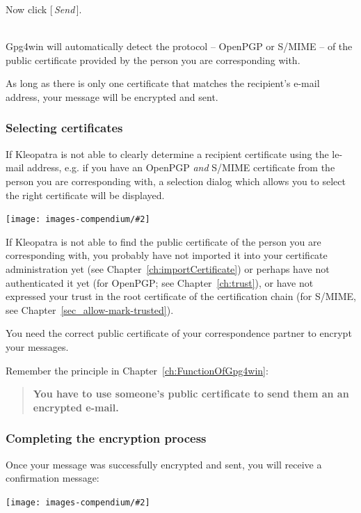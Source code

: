 \documentclass[a4paper,11pt,oneside,openright,titlepage]{scrbook}
\newcommand{\Button}[1]{[\,\textit{#1}\,]}
\newcommand{\Email}{e-mail}
\newcommand{\IncludeImage}[2][]{
\begin{center}
  \texttt{[image: images-compendium/\#2]}%
\end{center}
}
\begin{document}
Now click \Button{Send}.

\label{encryptProtocol} ~\\Gpg4win will automatically detect the
protocol -- OpenPGP or S/MIME -- of the public certificate provided by
the person you are corresponding with.

As long as there is only one certificate that matches the recipient's
\Email{} address, your message will be encrypted and sent.


\clearpage
\subsubsection{Selecting certificates}
If Kleopatra is not able to clearly determine a recipient certificate
using the l\Email{} address, e.g. if you have an OpenPGP
\textit{and} S/MIME certificate from the person you are corresponding
with, a selection dialog which allows you to select the right
certificate will be displayed.

\IncludeImage[width=0.85\textwidth]{sc-kleopatra-encrypt-selectCertificate_en}

If Kleopatra is not able to find the public certificate of the person
you are corresponding with, you probably have not imported it into
your certificate administration yet (see
Chapter~\ref{ch:importCertificate}) or perhaps have not authenticated
it yet (for OpenPGP; see Chapter~\ref{ch:trust}), or have not
expressed your trust in the root certificate of the certification
chain (for S/MIME, see Chapter~\ref{sec_allow-mark-trusted}).

You need the correct public certificate of your correspondence partner
to encrypt your messages.

Remember the principle in Chapter~\ref{ch:FunctionOfGpg4win}:
\begin{quote}
  \textbf{You have to use someone's public certificate to send them an an encrypted \Email{}.}
\end{quote}


\clearpage
\subsubsection{Completing the encryption process}
Once your message was successfully encrypted and sent, you will
receive a confirmation message:

\IncludeImage[width=0.85\textwidth]{sc-kleopatra-encryption-successful_de}
\end{document}
